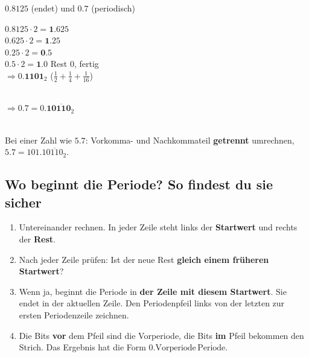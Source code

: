 \begin{beispiel}{$0.8125$ (endet) und $0.7$ (periodisch)}
  \begin{minipage}[t]{0.42\linewidth}
    $0.8125 \cdot 2 = \mathbf{1}.625$\\
    $0.625 \cdot 2 = \mathbf{1}.25$\\
    $0.25 \cdot 2 = \mathbf{0}.5$\\
    $0.5 \cdot 2 = \mathbf{1}.0$ \;\; Rest 0, fertig\\[2pt]
    $\Rightarrow 0.\mathbf{1101}_2$ \;($\frac12 + \frac14 + \frac1{16}$)
  \end{minipage}\hfill
  \begin{minipage}[t]{0.52\linewidth}
    \vspace{-8pt}
    \\[2pt]
    $\Rightarrow 0.7 = 0.\mathbf{1}\overline{\mathbf{0110}}_2$
  \end{minipage}\\[4pt]
  Bei einer Zahl wie $5.7$: Vorkomma- und Nachkommateil \textbf{getrennt} umrechnen,
  $5.7 = 101.1\overline{0110}_2$.
\end{beispiel}

\subsection*{Wo beginnt die Periode? So findest du sie sicher}
\begin{enumerate}[nosep]
  \item Untereinander rechnen. In jeder Zeile steht links der \textbf{Startwert} und rechts der \textbf{Rest}.
  \item Nach jeder Zeile prüfen: Ist der neue Rest \textbf{gleich einem früheren Startwert}?
  \item Wenn ja, beginnt die Periode in \textbf{der Zeile mit diesem Startwert}. Sie
        endet in der aktuellen Zeile. Den Periodenpfeil links von der letzten zur ersten
        Periodenzeile zeichnen.
  \item Die Bits \textbf{vor} dem Pfeil sind die Vorperiode, die Bits \textbf{im} Pfeil
        bekommen den Strich. Das Ergebnis hat die Form
        $0.\text{Vorperiode}\,\overline{\text{Periode}}$.
\end{enumerate}

